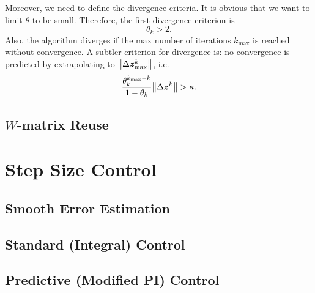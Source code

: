 \documentclass[a4paper,9pt]{article}
\theoremstyle{definition}
\theoremstyle{remark}
\begin{document}
Moreover, we need to define the divergence criteria. It is obvious that we want
to limit $\theta$ to be small. Therefore, the first divergence criterion is
\begin{equation}
  \theta_k > 2.
\end{equation}
Also, the algorithm diverges if the max number of iterations $k_{\max}$ is
reached without convergence. A subtler criterion for divergence is: no
convergence is predicted by extrapolating to $\norm{\Delta\bm{z}^k_{\max}}$,
i.e.
\begin{equation}
  \frac{\theta_k^{k_{\max}-k}}{1-\theta_k} \norm{\Delta\bm{z}^k} > \kappa.
\end{equation}

\subsection{$W$-matrix Reuse}

\section{Step Size Control}
\subsection{Smooth Error Estimation}
\subsection{Standard (Integral) Control}
\subsection{Predictive (Modified PI) Control}

\nocite{hairer2010solving}



\end{document}
